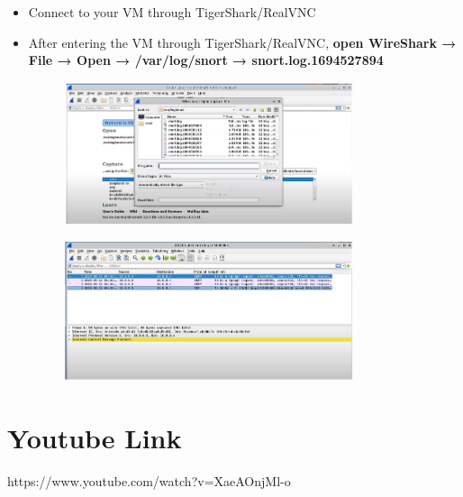 \documentclass[12pt, A4Paper]{article}
\begin{document}
\begin{enumerate}
\begin{itemize}
        \item Connect to your VM through TigerShark/RealVNC

        \item After entering the VM through TigerShark/RealVNC, \textbf{open WireShark → File → Open → /var/log/snort → snort.log.1694527894}\\
        \begin{figure}[h]
            \centering
            \includegraphics[width=0.8\textwidth]{images/open_file_wireshark}
        \end{figure}
        \begin{figure}[h]
            \centering
            \includegraphics[width=0.8\textwidth]{images/examine_file_wireshark}
        \end{figure}
    \end{itemize}
\end{enumerate}
\vspace{0.4cm}

\section{Youtube Link}
https://www.youtube.com/watch?v=XaeAOnjMl-o
\end{document}
